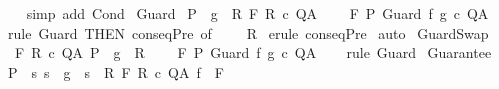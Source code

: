 \begin{isabellebody}
%
\isadelimproof
\ \ %
\endisadelimproof
%
\isatagproof
{}\isamarkupfalse%
\ {\isacharparenleft}simp\ add{\isacharcolon}\ Cond{\isacharparenright}%
\endisatagproof
{\isafoldproof}%
%
\isadelimproof
\isanewline
%
\endisadelimproof
\isanewline
{}\isamarkupfalse%
\ Guard{\isacharcolon}\isanewline
\ {\isachardoublequoteopen}{\isasymlbrakk}P\ {\isasymsubseteq}\ g\ {\isasyminter}\ R{\isacharsemicolon}\ {\isasymGamma}{\isacharcomma}{\isasymTheta}{\isasymturnstile}\isactrlbsub {\isacharslash}F\isactrlesub \ R\ c\ Q{\isacharcomma}A{\isasymrbrakk}\ \isanewline
\ \ {\isasymLongrightarrow}\ {\isasymGamma}{\isacharcomma}{\isasymTheta}{\isasymturnstile}\isactrlbsub {\isacharslash}F\isactrlesub \ P\ {\isacharparenleft}Guard\ f\ g\ c{\isacharparenright}\ Q{\isacharcomma}A{\isachardoublequoteclose}\isanewline
%
\isadelimproof
%
\endisadelimproof
%
\isatagproof
{}\isamarkupfalse%
\ {\isacharparenleft}rule\ Guard\ {\isacharbrackleft}THEN\ conseqPre{\isacharcomma}\ of\ {\isacharunderscore}\ {\isacharunderscore}\ {\isacharunderscore}\ {\isacharunderscore}\ R{\isacharbrackright}{\isacharparenright}\isanewline
{}\isamarkupfalse%
\ {\isacharparenleft}erule\ conseqPre{\isacharparenright}\isanewline
{}\isamarkupfalse%
\ auto\isanewline
{}\isamarkupfalse%
%
\endisatagproof
{\isafoldproof}%
%
\isadelimproof
\isanewline
%
\endisadelimproof
\isanewline
{}\isamarkupfalse%
\ GuardSwap{\isacharcolon}\isanewline
\ {\isachardoublequoteopen}{\isasymlbrakk}\ {\isasymGamma}{\isacharcomma}{\isasymTheta}{\isasymturnstile}\isactrlbsub {\isacharslash}F\isactrlesub \ R\ c\ Q{\isacharcomma}A{\isacharsemicolon}\ P\ {\isasymsubseteq}\ g\ {\isasyminter}\ R{\isasymrbrakk}\ \isanewline
\ \ {\isasymLongrightarrow}\ {\isasymGamma}{\isacharcomma}{\isasymTheta}{\isasymturnstile}\isactrlbsub {\isacharslash}F\isactrlesub \ P\ {\isacharparenleft}Guard\ f\ g\ c{\isacharparenright}\ Q{\isacharcomma}A{\isachardoublequoteclose}\isanewline
%
\isadelimproof
\ \ %
\endisadelimproof
%
\isatagproof
{}\isamarkupfalse%
\ {\isacharparenleft}rule\ Guard{\isacharparenright}%
\endisatagproof
{\isafoldproof}%
%
\isadelimproof
\isanewline
%
\endisadelimproof
\isanewline
{}\isamarkupfalse%
\ Guarantee{\isacharcolon}\isanewline
\ {\isachardoublequoteopen}{\isasymlbrakk}P\ {\isasymsubseteq}\ {\isacharbraceleft}s{\isachardot}\ s\ {\isasymin}\ g\ {\isasymlongrightarrow}\ s\ {\isasymin}\ R{\isacharbraceright}{\isacharsemicolon}\ {\isasymGamma}{\isacharcomma}{\isasymTheta}{\isasymturnstile}\isactrlbsub {\isacharslash}F\isactrlesub \ R\ c\ Q{\isacharcomma}A{\isacharsemicolon}\ f\ {\isasymin}\ F{\isasymrbrakk}\ \isanewline

\end{isabellebody}
